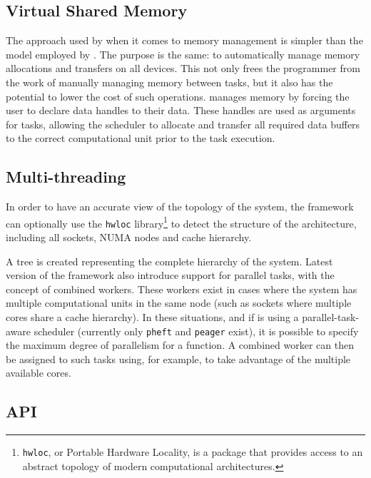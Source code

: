 \documentclass[main.tex]{subfiles}
\begin{document}
\subsection{Virtual Shared Memory}

The approach used by \starpu when it comes to memory management is simpler than the model employed by \gama. The purpose is the same: to automatically manage memory allocations and transfers on all devices. This not only frees the programmer from the work of manually managing memory between tasks, but it also has the potential to lower the cost of such operations.
\starpu manages memory by forcing the user to declare data handles to their data. These handles are used as arguments for tasks, allowing the scheduler to allocate and transfer all required data buffers to the correct computational unit prior to the task execution.

\subsection{Multi-threading} \label{section:starpu_multithreading}

In order to have an accurate view of the topology of the system, the framework can optionally use the \texttt{hwloc} library\footnote{\texttt{hwloc}, or Portable Hardware Locality, is a package that provides access to an abstract topology of modern computational architectures.} \cite{broquedis2010hwloc} to detect the structure of the architecture, including all \cpu sockets, \acs{NUMA} nodes and cache hierarchy.

A tree is created representing the complete hierarchy of the system. Latest version of the framework also introduce support for parallel tasks, with the concept of combined workers. These workers exist in cases where the system has multiple computational units in the same node (such as \cpu sockets where multiple cores share a cache hierarchy). In these situations, and if \starpu is using a parallel-task-aware scheduler (currently only \texttt{pheft} and \texttt{peager} exist), it is possible to specify the maximum degree of parallelism for a function. A combined worker can then be assigned to such tasks using, for example, \openmp to take advantage of the multiple available cores.

\subsection{API} \label{section:starpu_api}
\end{document}
